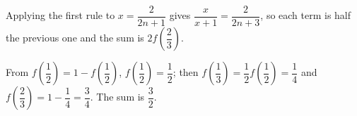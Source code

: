 Applying the first rule to $x=\dfrac2{2n+1}$ gives $\dfrac x{x+1}=\dfrac2{2n+3}$, so each term is half the previous one and the sum is $2f\left(\dfrac23\right)$.

From $f\left(\dfrac12\right)=1-f\left(\dfrac12\right)$, $f\left(\dfrac12\right)=\dfrac12$; then $f\left(\dfrac13\right)=\dfrac12f\left(\dfrac12\right)=\dfrac14$ and $f\left(\dfrac23\right)=1-\dfrac14=\dfrac34$. The sum is $\boxed{\dfrac32}$.
